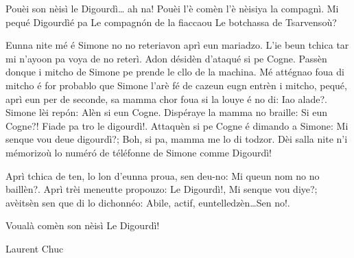 {Pouèi son nèisì le Digourdì… ah na! Pouèi l'è comèn l'è nèisiya la compagnì. Mi pequé \og Digourdì\fg é pa \og Le compagn\'on de la fiacca\fg ou \og Le botchassa de Tsarvensoù\fg?

Eunna nite mé é Simone no no reteriavon aprì eun mariadzo. L'ie beun tchica tar mi n'ayoon pa voya de no reterì. Adon désidèn d'ataqué si pe Cogne. Passèn donque i mitcho de Simone pe prende le cllo de la machina. Mé attégnao foua di mitcho é for probablo que Simone l'arè fé de cazeun eugn entrèn i mitcho, pequé, aprì eun per de seconde, sa mamma chor foua si la louye é no di: \og Iao alade?\fg. Simone lèi rep\'on: \og Alèn si eun Cogne\fg. Dispéraye la mamma no braille: \og Si eun Cogne?! Fiade pa tro le digourdì!\fg.
Attaquèn si pe Cogne é dimando a Simone: \og Mi senque vou deue digourdì?\fg; \og Boh, si pa, mamma me lo di todzor\fg. Dèi salla nite n'i mémorizoù lo numér\'o de téléfonne de Simone comme \og Digourdì\fg!

Aprì tchica de ten, lo lon d'eunna proua, sen deu-no: \og Mi queun nom no no baillèn?\fg. Aprì trèi meneutte propouzo: \og Le Digourdì!\fg, \og Mi senque vou diye?\fg; avèitsèn sen que di lo dichonnéo: \og Abile, actif, euntelledzèn\fg\ldots \og Sen no!\fg.

Voualà comèn son nèisì Le Digourdì!}{Laurent Chuc}
